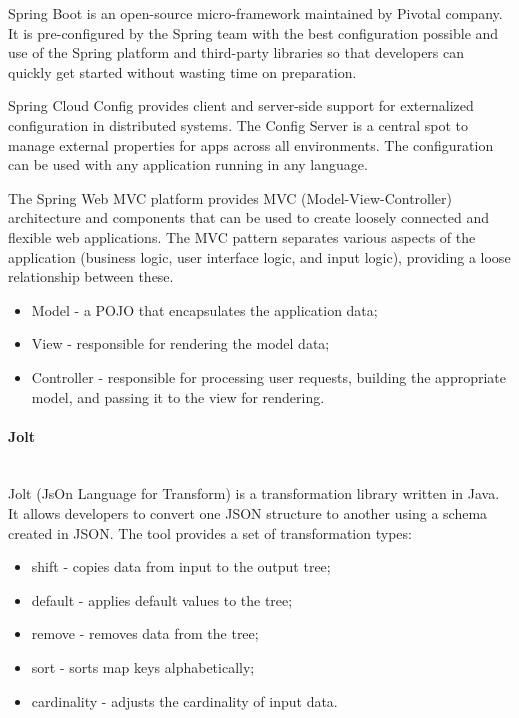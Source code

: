 Spring Boot is an open-source micro-framework maintained by Pivotal company. It is pre-configured by the Spring team with the best configuration possible and use of the Spring platform and third-party libraries so that developers can quickly get started without wasting time on preparation.~\cite{spring-boot}

Spring Cloud Config provides client and server-side support for externalized configuration in distributed systems. The Config Server is a central spot to manage external properties for apps across all environments. The configuration can be used with any application running in any language.~\cite{spring-cloud-config}

The Spring Web MVC platform provides MVC (Model-View-Controller) architecture and components that can be used to create loosely connected and flexible web applications. The MVC pattern separates various aspects of the application (business logic, user interface logic, and input logic), providing a loose relationship between these.~\cite{spring-mvc}

\begin{itemize}
    \item Model - a POJO that encapsulates the application data;
    \item View - responsible for rendering the model data;
    \item Controller - responsible for processing user requests, building the appropriate model, and passing it to the view for rendering.
\end{itemize}

\paragraph{\large{Jolt}}\mbox{}\\[2pt]
Jolt (JsOn Language for Transform) is a transformation library written in Java. It allows developers to convert one JSON structure to another using a schema created in JSON. The tool provides a set of transformation types:

\begin{itemize}
    \item shift - copies data from input to the output tree;
    \item default - applies default values to the tree;
    \item remove - removes data from the tree;
    \item sort - sorts map keys alphabetically;
    \item cardinality - adjusts the cardinality of input data.
\end{itemize}

